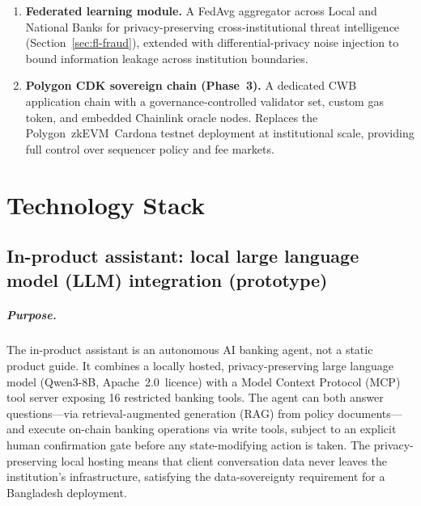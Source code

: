 \documentclass[12pt,a4paper]{report}
\begin{document}
\begin{enumerate}[noitemsep]
\item \textbf{Federated learning module.} A FedAvg aggregator across Local and National Banks for privacy-preserving cross-institutional threat intelligence (Section~\ref{sec:fl-fraud}), extended with differential-privacy noise injection to bound information leakage across institution boundaries.

\item \textbf{Polygon CDK sovereign chain (Phase~3).} A dedicated CWB application chain with a governance-controlled validator set, custom gas token, and embedded Chainlink oracle nodes. Replaces the Polygon~zkEVM~Cardona testnet deployment at institutional scale, providing full control over sequencer policy and fee markets.
\end{enumerate}


\appendix

\chapter{Technology Stack}

\section{In-product assistant: local large language model (LLM) integration (prototype)}

\paragraph{Purpose.}
The in-product assistant is an autonomous AI banking agent, not a static product guide. It combines a locally hosted, privacy-preserving large language model (Qwen3-8B, Apache~2.0~licence) with a Model Context Protocol (MCP) tool server exposing 16 restricted banking tools. The agent can both answer questions---via retrieval-augmented generation (RAG) from policy documents---and execute on-chain banking operations via write tools, subject to an explicit human confirmation gate before any state-modifying action is taken. The privacy-preserving local hosting means that client conversation data never leaves the institution's infrastructure, satisfying the data-sovereignty requirement for a Bangladesh deployment.
\end{document}
